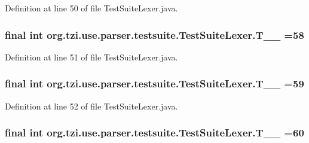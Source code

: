 Definition at line 50 of file Test\-Suite\-Lexer.\-java.

\hypertarget{classorg_1_1tzi_1_1use_1_1parser_1_1testsuite_1_1_test_suite_lexer_a022da95e01600deede48df41b69dcee6}{
\subsubsection[{T\-\_\-\-\_\-58}]{\setlength{\rightskip}{0pt plus 5cm}final int org.\-tzi.\-use.\-parser.\-testsuite.\-Test\-Suite\-Lexer.\-T\-\_\-\-\_ =58\hspace{0.3cm}{\ttfamily [static]}}}\label{classorg_1_1tzi_1_1use_1_1parser_1_1testsuite_1_1_test_suite_lexer_a022da95e01600deede48df41b69dcee6}


Definition at line 51 of file Test\-Suite\-Lexer.\-java.

\hypertarget{classorg_1_1tzi_1_1use_1_1parser_1_1testsuite_1_1_test_suite_lexer_a9f952cc7b71c178ba7622dd12ff5aa21}{
\subsubsection[{T\-\_\-\-\_\-59}]{\setlength{\rightskip}{0pt plus 5cm}final int org.\-tzi.\-use.\-parser.\-testsuite.\-Test\-Suite\-Lexer.\-T\-\_\-\-\_ =59\hspace{0.3cm}{\ttfamily [static]}}}\label{classorg_1_1tzi_1_1use_1_1parser_1_1testsuite_1_1_test_suite_lexer_a9f952cc7b71c178ba7622dd12ff5aa21}


Definition at line 52 of file Test\-Suite\-Lexer.\-java.

\hypertarget{classorg_1_1tzi_1_1use_1_1parser_1_1testsuite_1_1_test_suite_lexer_ae8cfdefa1386b79c5f8e33118bf32bfb}{
\subsubsection[{T\-\_\-\-\_\-60}]{\setlength{\rightskip}{0pt plus 5cm}final int org.\-tzi.\-use.\-parser.\-testsuite.\-Test\-Suite\-Lexer.\-T\-\_\-\-\_ =60\hspace{0.3cm}{\ttfamily [static]}}}\label{classorg_1_1tzi_1_1use_1_1parser_1_1testsuite_1_1_test_suite_lexer_ae8cfdefa1386b79c5f8e33118bf32bfb}



